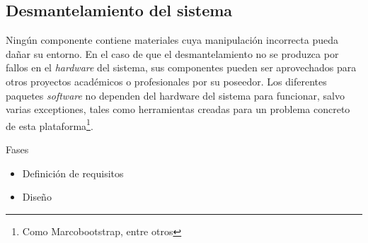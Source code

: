 \subsection{Desmantelamiento del sistema}

Ningún componente contiene materiales cuya manipulación incorrecta pueda dañar su entorno. En el caso de que el desmantelamiento no se produzca por fallos en el \textit{hardware} del sistema, sus componentes pueden ser aprovechados para otros proyectos académicos o profesionales por su poseedor. Los diferentes paquetes \textit{software} no dependen del hardware del sistema para funcionar, salvo varias exceptiones, tales como herramientas creadas para un problema concreto de esta plataforma\footnote{Como Marcobootstrap, entre otros}.

Fases
\begin{itemize}
  \item Definición de requisitos
  \item Diseño
\end{itemize}




